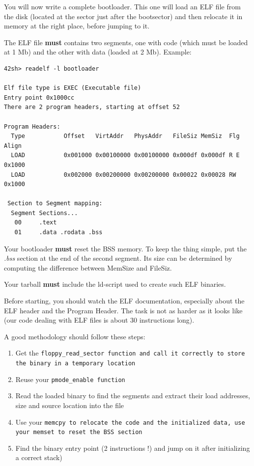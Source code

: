 You will now write a complete bootloader. This one will load an ELF
file from the disk (located at the sector just after the bootsector)
and then relocate it in memory at the right place, before jumping to
it.

The ELF file \textbf{must} contains two segments, one with code (which
must be loaded at 1 Mb) and the other with data (loaded at 2
Mb). Example:

\begin{verbatim}
42sh> readelf -l bootloader

Elf file type is EXEC (Executable file)
Entry point 0x1000cc
There are 2 program headers, starting at offset 52

Program Headers:
  Type           Offset   VirtAddr   PhysAddr   FileSiz MemSiz  Flg Align
  LOAD           0x001000 0x00100000 0x00100000 0x000df 0x000df R E 0x1000
  LOAD           0x002000 0x00200000 0x00200000 0x00022 0x00028 RW  0x1000

 Section to Segment mapping:
  Segment Sections...
   00     .text
   01     .data .rodata .bss
\end{verbatim}

Your bootloader \textbf{must} reset the BSS memory. To keep the thing
simple, put the \emph{.bss} section at the end of the second
segment. Its size can be determined by computing the difference
between MemSize and FileSiz.

Your tarball \textbf{must} include the ld-script used to create such
ELF binaries.

Before starting, you should watch the ELF documentation, especially
about the ELF header and the Program Header. The task is not as harder
as it looks like (our code dealing with ELF files is about 30
instructions long).

A good methodology should follow these steps:

  \begin{enumerate}

    \item {Get the \tt floppy\_read\_sector \rm function and call it
    correctly to store the binary in a temporary location}

    \item {Reuse your \tt pmode\_enable \rm function}

    \item {Read the loaded binary to find the segments and extract
    their load addresses, size and source location into the file}

    \item {Use your \tt memcpy \rm to relocate the code and the
    initialized data, use your \tt memset \rm to reset the BSS section}

    \item {Find the binary entry point (2 instructions !) and jump on
    it after initializing a correct stack)}

  \end{enumerate}

